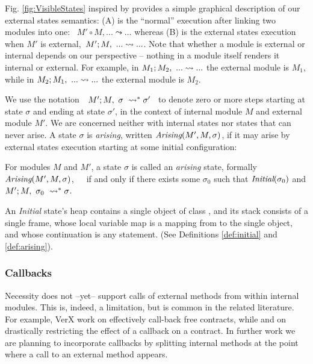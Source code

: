 Fig. \ref{fig:VisibleStates} inspired by  provides a simple graphical description of 
our external states semantics: (A) is the ``normal'' execution after 
linking two modules into one: \ $M' \circ M, ... \leadsto ...$ whereas (B) is the
 external states execution when $M'$ is external,\   $M' ; M,\ ... \leadsto ...$.
Note that whether a module is external or internal depends on our
perspective -- nothing in a module itself renders it internal or external. For example, in
 $M_1 ; M_2,\ ... \leadsto ...$ the external module is $M_1$,
  while in  $M_2 ; M_1,\ ... \leadsto ...$  the external module is $M_2$.

We  use the notation\ \  $M' ; M,\ \sigma\ \leadsto^* \sigma'$ \ 
to denote zero or more  steps starting at state $\sigma$ and ending at state $\sigma'$, in the context of internal module 
$M$ and external module $M'$.
We are concerned neither with internal states nor states that can never arise.
{A state $\sigma$ is \emph{arising},}  written $\textit{Arising}(M', M, \sigma)$, {if it  may arise by external states} execution
starting at some initial configuration:



\begin{definition}
\label{def:arising}
For   modules $M$ and  $M'$, a %
 state $\sigma$ is 
called an \emph{arising} state, formally \ \ \ $\textit{Arising}(M', M, \sigma)$,\ \ \ 
if and only if there exists some $\sigma_0$ such that $\textit{Initial}(\sigma_0)$ and
$M' ; M,\ \sigma_0\ \leadsto^* \sigma$.
\end{definition}

An \emph{Initial} state's heap
contains a single object of class , and
its  stack   consists of a single frame, whose local variable map is a
mapping from \prg{this} to the single object, and whose continuation is  any statement.
(See Definitions \ref{def:initial} and \ref{def:arising}).

\subsubsection{Callbacks} 
\label{sec:callbacks}
{Necessity does not --yet-- support calls of external methods from within internal modules. 
This is, indeed, a limitation, but is common in the related literature. 
For example, VerX \cite{Permenev} work on effectively call-back free contracts, 
while \cite{Grossman} and  \cite{Albert} on drastically restricting the effect of a callback on a contract. 
In further work we are planning to incorporate callbacks by   
splitting internal methods at the point where a call to an external method appears.}

